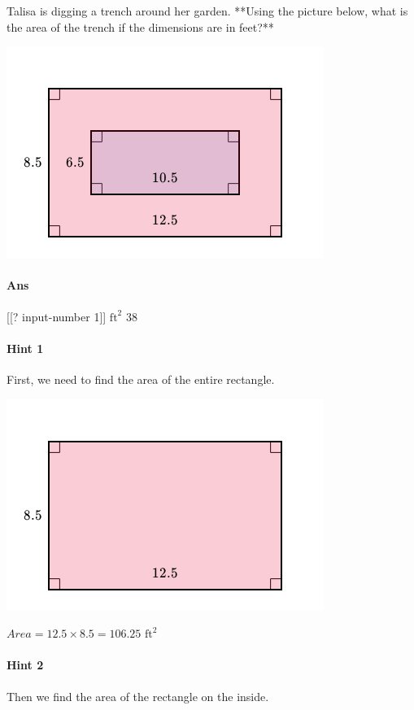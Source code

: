 \documentclass[twocolumn,10pt]{article}
\def\shrinkfactor{0.55}
\begin{document}
\noindent
Talisa is digging a trench around her garden.  **Using the picture below, what is the area of the trench if the dimensions are in feet?**  


\includegraphics[scale=\shrinkfactor]{figures/3145ae3a2a9e1573cf5b0da93f1c11d27935202c.png}

\paragraph{Ans}  [[? input-number 1]] $\text{ft}^2$  38

\paragraph{Hint 1}First, we need to find the area of the entire rectangle.  


\includegraphics[scale=\shrinkfactor]{figures/fb375bf268b455b2101c50440f9def202afa0699.png}  
 
$Area=12.5\times8.5=106.25  \text{ ft}^2$  

\paragraph{Hint 2}Then we find the area of the rectangle on the inside.  
\end{document}
